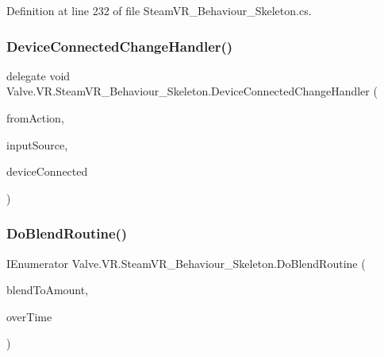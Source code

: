 Definition at line 232 of file Steam\+V\+R\+\_\+\+Behaviour\+\_\+\+Skeleton.\+cs.

\mbox{\label{class_valve_1_1_v_r_1_1_steam_v_r___behaviour___skeleton_aa05646483bd740b42ea2455f964f9cf7}} 
\subsubsection{\texorpdfstring{DeviceConnectedChangeHandler()}{DeviceConnectedChangeHandler()}}
{\footnotesize\ttfamily delegate void Valve.\+V\+R.\+Steam\+V\+R\+\_\+\+Behaviour\+\_\+\+Skeleton.\+Device\+Connected\+Change\+Handler (\begin{DoxyParamCaption}\item[{\mbox{\hyperlink{class_valve_1_1_v_r_1_1_steam_v_r___behaviour___skeleton}{Steam\+V\+R\+\_\+\+Behaviour\+\_\+\+Skeleton}}}]{from\+Action,  }\item[{\mbox{\hyperlink{namespace_valve_1_1_v_r_a82e5bf501cc3aa155444ee3f0662853f}{Steam\+V\+R\+\_\+\+Input\+\_\+\+Sources}}}]{input\+Source,  }\item[{bool}]{device\+Connected }\end{DoxyParamCaption})}

\mbox{\label{class_valve_1_1_v_r_1_1_steam_v_r___behaviour___skeleton_a9c87664a5fcf9306f84858ce43624734}} 
\subsubsection{\texorpdfstring{DoBlendRoutine()}{DoBlendRoutine()}}
{\footnotesize\ttfamily I\+Enumerator Valve.\+V\+R.\+Steam\+V\+R\+\_\+\+Behaviour\+\_\+\+Skeleton.\+Do\+Blend\+Routine (\begin{DoxyParamCaption}\item[{float}]{blend\+To\+Amount,  }\item[{float}]{over\+Time }\end{DoxyParamCaption})\hspace{0.3cm}{\ttfamily [protected]}}



